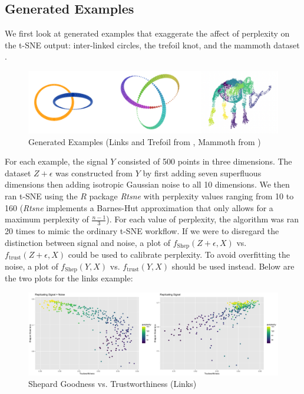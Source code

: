 \documentclass{article}
\begin{document}
\subsection{Generated Examples}

We first look at generated examples that exaggerate the affect of perplexity on the t-SNE output: inter-linked circles, the trefoil knot, and the mammoth dataset \cite{understanding DR}.

\begin{figure}[H]
\includegraphics[scale=0.4]{links}
\centering
\caption{Generated Examples (Links and Trefoil from \cite{Distill}, Mammoth from \cite{understanding DR})}
\end{figure}

For each example, the signal $Y$ consisted of 500 points in three dimensions. The dataset $Z + \epsilon$ was constructed from $Y$ by first adding seven superfluous dimensions then adding isotropic Gaussian noise to all 10 dimensions. We then ran t-SNE using the $R$ package \textit{Rtsne} with perplexity values ranging from 10 to 160 (\textit{Rtsne} implements a Barnes-Hut approximation that only allows for a maximum perplexity of $\frac{n-1}{3}$). For each value of perplexity, the algorithm was ran 20 times to mimic the ordinary t-SNE workflow. If we were to disregard the distinction between signal and noise, a plot of $f_\textrm{Shep}(Z + \epsilon, X)$ vs. $f_\textrm{trust}(Z + \epsilon, X)$ could be used to calibrate perplexity. To avoid overfitting the noise, a plot of $f_\textrm{Shep}(Y, X)$ vs. $f_\textrm{trust}(Y, X)$ should be used instead. Below are the two plots for the links example:

\begin{figure}[H]
\includegraphics[scale=0.25]{links plot}
\centering
\caption{Shepard Goodness vs. Trustworthiness (Links)}
\end{figure}
\end{document}
